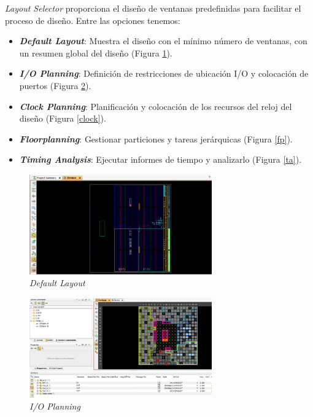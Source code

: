 \textit{Layout Selector} proporciona el diseño de ventanas predefinidas para facilitar el proceso de diseño. Entre las opciones tenemos:
\begin{itemize}
    \item \textit{\textbf{Default Layout}}: Muestra el diseño con el mínimo número de ventanas, con un resumen global del diseño (Figura \ref{default}).
    \item \textit{\textbf{I/O Planning}}: Definición de restricciones de ubicación I/O y colocación de puertos (Figura \ref{io}).
    \item \textit{\textbf{Clock Planning}}: Planificación y colocación de los recursos del reloj del diseño (Figura \ref{clock}).
    \item \textit{\textbf{Floorplanning}}: Gestionar particiones y tareas jerárquicas (Figura \ref{fp}).
    \item \textit{\textbf{Timing Analysis}}: Ejecutar informes de tiempo y analizarlo (Figura \ref{ta}).
\end{itemize} 

\begin{figure}[H]
    \centering
    \includegraphics[width = 0.7\textwidth]{imagenes/default.png}
    \caption{\textit{Default Layout}}\label{default}
\end{figure}

\begin{figure}[H]
    \centering
    \includegraphics[width = 0.7\textwidth]{imagenes/io.png}
    \caption{\textit{I/O Planning}}\label{io}
\end{figure}

